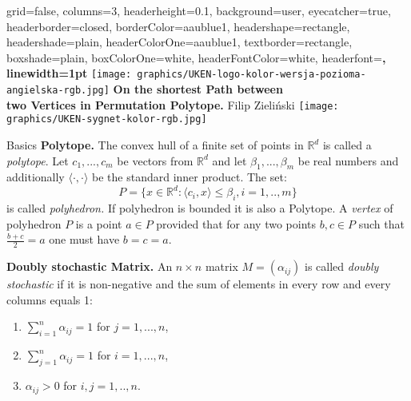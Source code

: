 \documentclass[a0paper,portrait]{xebaposter}
\begin{document}
\begin{poster}{
  grid=false,
  columns=3,
  headerheight=0.1\textheight,
  background=user,
  eyecatcher=true,
  headerborder=closed,
  borderColor=aaublue1,
  headershape=rectangle,
  headershade=plain,
  headerColorOne=aaublue1,
  textborder=rectangle,
  boxshade=plain,
  boxColorOne=white,
  headerFontColor=white,
  headerfont=\Large\sf\bf,
  linewidth=1pt
}
{
  \texttt{[image: graphics/UKEN-logo-kolor-wersja-pozioma-angielska-rgb.jpg]}
}
{\color{white}\huge \bf
   On the shortest Path between \\ \vspace{0.2cm} two Vertices in Permutation Polytope.
}
{\color{white}\small
  \vspace{1em} Filip Zieliński
}
{
  \texttt{[image: graphics/UKEN-sygnet-kolor-rgb.jpg]}
}


\begin{posterbox}[name=intro,column=0,row=0, span=2]{Basics}
    \textbf{Polytope.} The convex hull of a finite set of points in $ \mathbb{R}^d$ is called a \textit{polytope}.
    Let $c_{1},..., c_{m}$ be vectors from $ \mathbb{R}^d$ and let $\beta_{1}, ... , \beta_{m}$ be real numbers and additionally $\langle \cdot,\cdot \rangle$ be  the standard inner product. The set:
    $$P = \{ x \in \mathbb{R}^d : \langle c_{i},x \rangle \leq \beta_{i},  i=1,..,m\}$$
    is called \textit{polyhedron.}
If polyhedron is bounded it is also a Polytope. 
        A \textit{vertex} of polyhedron $P$ is a point $a \in P$ provided that for any two points $b,c \in P$  such that $\frac{b+c}{2} = a$ one must have $b = c = a$.

    \textbf{Doubly stochastic Matrix.} An  $n \times n $  matrix $M=(\alpha_{ij}) $ is called \textit{doubly stochastic} if it is non-negative and the sum of elements in every row and every columns equals 1:
    \begin{enumerate}
        \item $ \sum_{i=1}^{n}\alpha_{ij} =1 $ for $j=1,... ,n$,
        \item $ \sum_{j=1}^{n}\alpha_{ij}=1 $ for $i=1,... ,n$,
        \item $\alpha_{ij} >0$ for $i,j=1,.. ,n$.
    \end{enumerate}
    

\end{posterbox}
\end{poster}
\end{document}
